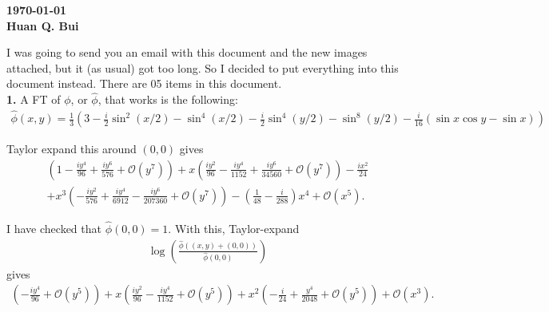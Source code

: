 \documentclass{article}
\theoremstyle{definition}
\newcommand{\nn}{\nonumber}
\newcommand{\f}[2]{\frac{#1}{#2}}
\newcommand{\lp}{\left(}
\newcommand{\rp}{\right)}
\begin{document}
\begin{center}
	\textbf{\today}\\
	\textbf{Huan Q. Bui}
\end{center}


I was going to send you an email with this document and the new images attached, but it (as usual) got too long. So I decided to put everything into this document instead. There are 05 items in this document. \\




\noindent \textbf{1.} A FT of $\phi$, or $\hat\phi$, that works is the following: 
\begin{align}
\hat{\phi}(x,y) =   \f{1}{3} \lp 3 - \f{i}{2}\sin^2(x/2) - \sin^4(x/2) - \f{i}{2}\sin^4(y/2) - \sin^8(y/2) - \f{i}{16}(\sin x \cos y - \sin x) \rp
\end{align}

Taylor expand this around $(0,0)$ gives 
\begin{align}
\left(1-\frac{iy^4}{96}+\frac{iy^6}{576}+ \mathcal{O}\left( y^7\right)\right) + x \left(\frac{i  y^2}{96}-\frac{i  y^4}{1152}+\frac{i  y^6}{34560}+ \mathcal{O}\left( y^7 \right)\right)-\frac{ix^2}{24}\nn\\
+ x^3 \left(-\frac{iy^2}{576}+\frac{iy^4}{6912}-\frac{iy^6}{207360}+ \mathcal{O}\left( y^7\right)\right)-\left(\frac{1}{48}-\frac{i}{288}\right)  x^4+ \mathcal{O}\left( x^5\right).
\end{align}

I have checked that $\hat{\phi}(0,0) = 1$. With this, Taylor-expand 
\begin{align}
\log\lp \f{\hat\phi((x,y) + (0,0))}{\hat\phi(0,0)} \rp
\end{align} 
gives
\begin{align}
\left(-\frac{i  y^4}{96}+\mathcal{O}\left( y^5\right)\right)+ x \left(\frac{i  y^2}{96}-\frac{i  y^4}{1152}+\mathcal{O}\left( y^5\right)\right)+ x^2 \left(-\frac{i}{24}+\frac{ y^4}{2048}+\mathcal{O}\left( y^5\right)\right)+\mathcal{O}\left( x^3\right).
\end{align}
\end{document}
